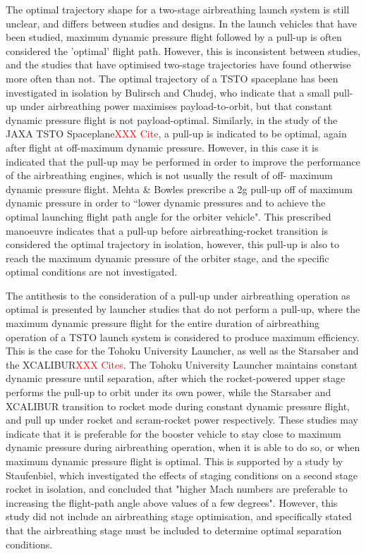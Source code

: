The optimal trajectory shape for a two-stage airbreathing launch system is still unclear, and differs between studies and designs. 
In the launch vehicles that have been studied, maximum dynamic pressure flight followed by a pull-up is often considered the 'optimal' flight path\cite{XXX}. However, this is inconsistent between studies, and the studies that have optimised two-stage trajectories have found otherwise more often than not. 
The optimal trajectory of a TSTO spaceplane has been investigated in isolation by Bulirsch and Chudej\cite{Bulirsch1995}, who indicate that a small pull-up under airbreathing power maximises payload-to-orbit, but that constant dynamic pressure flight is not payload-optimal. Similarly, in the study of the JAXA TSTO Spaceplane\textcolor{red}{XXX Cite}, a pull-up is indicated to be optimal, again after flight at off-maximum dynamic pressure. However, in this case it is indicated that the pull-up may be performed in order to improve the performance of the airbreathing engines, which is not usually the result of off- maximum dynamic pressure flight. 
Mehta \& Bowles\cite{Mehta2001} prescribe a 2g pull-up off of maximum dynamic pressure in order to ``lower dynamic pressures and to achieve the optimal launching flight path angle for the orbiter vehicle". This prescribed manoeuvre indicates that a pull-up before airbreathing-rocket transition is considered the optimal trajectory in isolation, however, this pull-up is also to reach the maximum dynamic pressure of the orbiter stage, and the specific optimal conditions are not investigated. 

The antithesis to the consideration of a pull-up under airbreathing operation as optimal is presented by launcher studies that do not perform a pull-up, where the maximum dynamic pressure flight for the entire duration of airbreathing operation of a TSTO launch system is considered to produce maximum efficiency. 
 This is the case for the Tohoku University Launcher, as well as the Starsaber and the XCALIBUR\textcolor{red}{XXX Cites}. The Tohoku University Launcher maintains constant dynamic pressure until separation, after which the rocket-powered upper stage performs the pull-up to orbit under its own power, while the Starsaber and XCALIBUR transition to rocket mode during constant dynamic pressure flight, and pull up under rocket and scram-rocket power respectively. These studies may indicate that it is preferable for the booster vehicle to stay close to maximum dynamic pressure during airbreathing operation, when it is able to do so, or when maximum dynamic pressure flight is optimal. This is supported by a study by Staufenbiel\cite{Staufenbiel2000}, which investigated the effects of staging conditions on a second stage rocket in isolation, and concluded that "higher Mach numbers are preferable to increasing the flight-path angle above values of a few degrees". However, this study did not include an airbreathing stage optimisation, and specifically stated that the airbreathing stage must be included to determine optimal separation conditions\cite{Staufenbiel2000}. 


